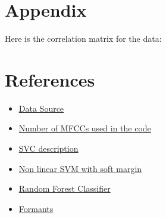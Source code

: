 \documentclass{article}
\begin{document}
\setcounter{page}{10}
\section*{Appendix}
Here is the correlation matrix for the data:\\
\begin{center}
    
\end{center}



\newpage
\section*{References}
\begin{itemize}
    \item \href{https://huggingface.co/datasets/common_language}{Data Source}
    
    \item \href{https://ietresearch.onlinelibrary.wiley.com/doi/full/10.1049/tje2.12082#:~:text=All\%20performance\%20metrics\%20gave\%20the,studies\%20use\%20only\%2013\%20MFCCs}{Number of MFCCs used in the code}

    \item \href{https://scikit-learn.org/stable/modules/generated/sklearn.svm.SVC.html}{SVC description}
    
    \item \href{https://scikit-learn.org/stable/modules/svm.html#svm-kernels}{Non linear SVM with soft margin}
    
    \item \href{https://scikit-learn.org/stable/modules/generated/sklearn.ensemble.RandomForestClassifier.html}{Random Forest Classifier}
    
    \item \href{}{Formants}
\end{itemize}
\end{document}
